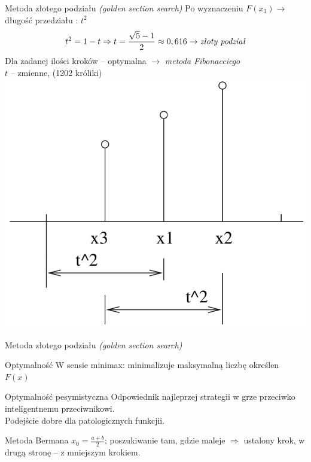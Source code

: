   \begin{frame}{Metoda złotego podziału \emph{(golden section search)}}
    Po wyznaczeniu $F(x_3) \to$ długość przedziału : $t^{2}$
    \begin{displaymath}
      t^{2} = 1 - t \Rightarrow t = \frac{\sqrt{5} - 1}{2} \approx 0,616 \to \text{\emph{złoty podział}}
    \end{displaymath}
    Dla zadanej ilości kroków -- optymalna $\to$ \emph{metoda Fibonacciego}\\
    $t$ -- zmienne, (1202 króliki)\\
    \centering
    \includegraphics[height=0.55\textheight]{img/17/fibb}
  \end{frame}

  \begin{frame}{Metoda złotego podziału \emph{(golden section search)}}
    \begin{block}{Optymalność}
      W sensie minimax: minimalizuje maksymalną liczbę określen
      $F(x)$
    \end{block}
    \begin{block}{Optymalność pesymistyczna}
      Odpowiednik najleprzej strategii w grze przeciwko
      inteligentnemu przeciwnikowi.\\
      Podejście dobre dla patologicznych funkcjii.
    \end{block}
    \begin{block}{Metoda Bermana}
      $x_{0} = \frac{a + b}{2}$; poszukiwanie tam, gdzie maleje
      $\Rightarrow$ ustalony krok, w drugą stronę -- z mniejszym krokiem.
    \end{block}
  \end{frame}

